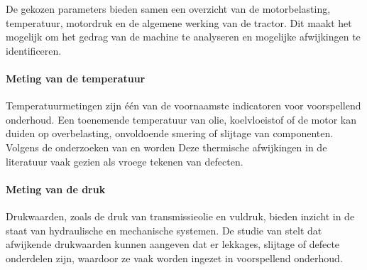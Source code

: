 De gekozen parameters bieden samen een overzicht van de motorbelasting, temperatuur, motordruk en de algemene werking van de tractor. Dit maakt het mogelijk om het gedrag van de machine te analyseren en mogelijke afwijkingen te identificeren.


\paragraph{Meting van de temperatuur}
Temperatuurmetingen zijn één van de voornaamste indicatoren voor voorspellend onderhoud. Een toenemende temperatuur van olie, koelvloeistof of de motor kan duiden op overbelasting, onvoldoende smering of slijtage van componenten. Volgens de onderzoeken van \textcite{Touil2025} en \textcite{WangXueyi2025} worden Deze thermische afwijkingen in de literatuur vaak gezien als vroege tekenen van defecten.


\paragraph{Meting van de druk}
Drukwaarden, zoals de druk van transmissieolie en vuldruk, bieden inzicht in de staat van hydraulische en mechanische systemen. De studie van \textcite{Daoudi2025} stelt dat afwijkende drukwaarden kunnen aangeven dat er lekkages, slijtage of defecte onderdelen zijn, waardoor ze vaak worden ingezet in voorspellend onderhoud.


